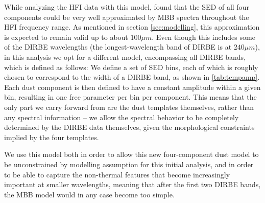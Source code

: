 \documentclass{aa}
\begin{document}
{While analyzing the HFI data with this model, \citet{CG02_06} found
that the SED of all four components could be very well approximated by
MBB spectra throughout the HFI frequency range. As mentioned in section
\ref{sec:modelling}, this approximation is expected to remain valid up to about
$100 \mu m$. Even though this includes some of the DIRBE wavelengths (the
longest-wavelength band of DIRBE is at $240 \mu m$), in this analysis we opt
for a different model, encompassing all DIRBE bands, which is defined as
follows: We define a set of SED bins, each of which is roughly chosen to
correspond to the width of a DIRBE band, as shown in \cref{tab:tempamp}. Each
dust component is then defined to have a constant amplitude within a given bin,
resulting in one free parameter per bin per component.  This means that the
only part we carry forward from \citet{CG02_06} are the dust templates
themselves, rather than any spectral information -- we allow the spectral
behavior to be completely determined by the DIRBE data themselves, given the
morphological constraints implied by the four templates.

We use this model both in order to allow this new four-component dust model to
be unconstrained by modelling assumption for this initial analysis, and in
order to be able to capture the non-thermal features that become increasingly
important at smaller wavelengths, meaning that after the first two DIRBE bands,
the MBB model would in any case become too simple. 

}
\end{document}
